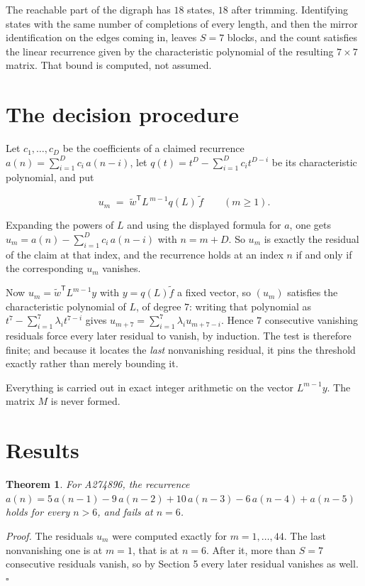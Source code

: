 \documentclass[11pt]{article}
\newtheorem{theorem}{Theorem}
\theoremstyle{definition}
\begin{document}
The reachable part of the digraph has $18$ states, $18$ after trimming. Identifying states with the same number of completions of every length, and then the mirror identification on the edges coming in, leaves $S = 7$ blocks, and the count satisfies the linear recurrence given by the characteristic polynomial of the resulting $7\times7$ matrix. That bound is computed, not assumed.

\section{The decision procedure}

Let $c_1,\dots,c_D$ be the coefficients of a claimed recurrence $a(n) = \sum_{i=1}^{D} c_i\,a(n-i)$, let $q(t) = t^{D} - \sum_{i=1}^{D} c_i t^{D-i}$ be its characteristic polynomial, and put

\[u_m \;=\; \tilde w^{\mathsf T} L^{\,m-1} q(L)\,\tilde f \qquad (m \ge 1).\]

Expanding the powers of $L$ and using the displayed formula for $a$, one gets $u_m = a(n) - \sum_{i=1}^{D} c_i\,a(n-i)$ with $n = m + D$. So $u_m$ is exactly the residual of the claim at that index, and the recurrence holds at an index $n$ if and only if the corresponding $u_m$ vanishes.

Now $u_m = \tilde w^{\mathsf T} L^{m-1} y$ with $y = q(L)\tilde f$ a fixed vector, so $(u_m)$ satisfies the characteristic polynomial of $L$, of degree $7$: writing that polynomial as $t^{7} - \sum_{i=1}^{7} \lambda_i t^{7-i}$ gives $u_{m+7} = \sum_{i=1}^{7} \lambda_i u_{m+7-i}$. Hence $7$ consecutive vanishing residuals force every later residual to vanish, by induction. The test is therefore finite; and because it locates the {\itshape last} nonvanishing residual, it pins the threshold exactly rather than merely bounding it.

Everything is carried out in exact integer arithmetic on the vector $L^{m-1}y$. The matrix $M$ is never formed.

\section{Results}

\begin{theorem} For A274896, the recurrence $a(n) = 5\,a(n-1) - 9\,a(n-2) + 10\,a(n-3) - 6\,a(n-4) + a(n-5)$ holds for every $n > 6$, and fails at $n = 6$.\end{theorem}

{\itshape Proof.} The residuals $u_m$ were computed exactly for $m = 1,\dots,44$. The last nonvanishing one is at $m = 1$, that is at $n = 6$. After it, more than $S = 7$ consecutive residuals vanish, so by Section 5 every later residual vanishes as well. $\square$
\end{document}
